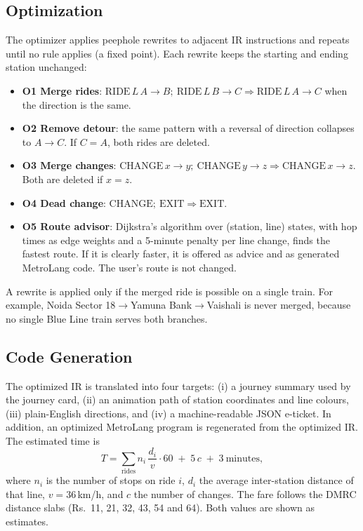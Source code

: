\documentclass[conference]{IEEEtran}
\begin{document}
\subsection{Optimization}\label{sec:opt}
The optimizer applies peephole rewrites to adjacent IR instructions and repeats until no rule applies (a fixed point). Each rewrite keeps the starting and ending station unchanged:
\begin{itemize}
\item \textbf{O1 Merge rides}: $\mathrm{RIDE}\,L\,A{\to}B;\ \mathrm{RIDE}\,L\,B{\to}C \Rightarrow \mathrm{RIDE}\,L\,A{\to}C$ when the direction is the same.
\item \textbf{O2 Remove detour}: the same pattern with a reversal of direction collapses to $A{\to}C$. If $C{=}A$, both rides are deleted.
\item \textbf{O3 Merge changes}: $\mathrm{CHANGE}\,x{\to}y;\ \mathrm{CHANGE}\,y{\to}z \Rightarrow \mathrm{CHANGE}\,x{\to}z$. Both are deleted if $x{=}z$.
\item \textbf{O4 Dead change}: $\mathrm{CHANGE};\ \mathrm{EXIT} \Rightarrow \mathrm{EXIT}$.
\item \textbf{O5 Route advisor}: Dijkstra's algorithm over (station, line) states, with hop times as edge weights and a 5-minute penalty per line change, finds the fastest route. If it is clearly faster, it is offered as advice and as generated MetroLang code. The user's route is not changed.
\end{itemize}
A rewrite is applied only if the merged ride is possible on a single train. For example, Noida Sector 18$\to$Yamuna Bank$\to$Vaishali is never merged, because no single Blue Line train serves both branches.

\subsection{Code Generation}
The optimized IR is translated into four targets: (i) a journey summary used by the journey card, (ii) an animation path of station coordinates and line colours, (iii) plain-English directions, and (iv) a machine-readable JSON e-ticket. In addition, an optimized MetroLang program is regenerated from the optimized IR. The estimated time is
\begin{equation}
T = \sum_{\text{rides}} n_i\,\frac{d_i}{v}\cdot 60 \;+\; 5\,c \;+\; 3 \ \text{minutes},
\end{equation}
where $n_i$ is the number of stops on ride $i$, $d_i$ the average inter-station distance of that line, $v=36$\,km/h, and $c$ the number of changes. The fare follows the DMRC distance slabs (Rs.~11, 21, 32, 43, 54 and 64). Both values are shown as estimates.
\end{document}
